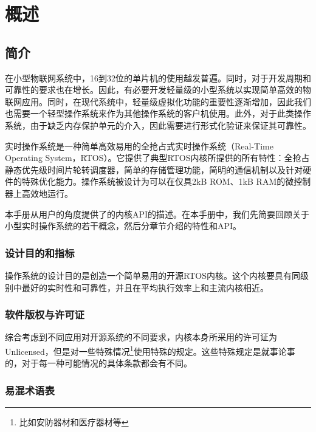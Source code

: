 \chapter{概述}\label{ch:overview}

\section{简介}\label{sec:introduction}

在小型物联网系统中，16到32位的单片机的使用越发普遍。同时，对于开发周期和可靠性的要求也在增长。因此，有必要开发轻量级的小型系统以实现简单高效的物联网应用。同时，在现代系统中，轻量级虚拟化功能的重要性逐渐增加，因此我们也需要一个轻型操作系统来作为其他操作系统的客户机使用。此外，对于此类操作系统，由于缺乏内存保护单元的介入，因此需要进行形式化验证来保证其可靠性。

实时操作系统是一种简单高效易用的全抢占式实时操作系统（Real-Time
Operating
System，RTOS）。它提供了典型RTOS内核所提供的所有特性：全抢占静态优先级时间片轮转调度器，简单的存储管理功能，简明的通信机制以及针对硬件的特殊优化能力。操作系统被设计为可以在仅具2kB
ROM、1kB RAM的微控制器上高效地运行。

本手册从用户的角度提供了的内核API的描述。在本手册中，我们先简要回顾关于小型实时操作系统的若干概念，然后分章节介绍的特性和API。

\subsection{\texorpdfstring{\textbf{设计目的和指标}}{设计目的和指标}}\label{subsec:design-goals-and-specifications}

操作系统的设计目的是创造一个简单易用的开源RTOS内核。这个内核要具有同级别中最好的实时性和可靠性，并且在平均执行效率上和主流内核相近。

\subsection{\texorpdfstring{\textbf{软件版权与许可证}}{软件版权与许可证}}\label{subsec:copyright-and-license}

综合考虑到不同应用对开源系统的不同要求，内核本身所采用的许可证为Unlicensed，但是对一些特殊情况\footnote{比如安防器材和医疗器材等}使用特殊的规定。这些特殊规定是就事论事的，对于每一种可能情况的具体条款都会有不同。

\subsection{易混术语表}\label{subsec:terms-and-definitions}

